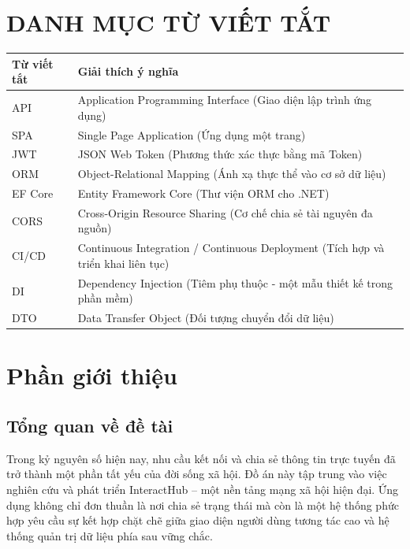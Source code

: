 \documentclass[a4paper]{article}
\begin{document}
\section*{DANH MỤC TỪ VIẾT TẮT}
\begin{table}[H]
    \centering
    \renewcommand{\arraystretch}{1.5}
    \begin{tabularx}{\textwidth}{|l|X|}
    \hline
    \rowcolor{gray!20}
    \textbf{Từ viết tắt} & \textbf{Giải thích ý nghĩa} \\
    \hline
    API & Application Programming Interface (Giao diện lập trình ứng dụng) \\
    \hline
    SPA & Single Page Application (Ứng dụng một trang) \\
    \hline
    JWT & JSON Web Token (Phương thức xác thực bằng mã Token) \\
    \hline
    ORM & Object-Relational Mapping (Ánh xạ thực thể vào cơ sở dữ liệu) \\
    \hline
    EF Core & Entity Framework Core (Thư viện ORM cho .NET) \\
    \hline
    CORS & Cross-Origin Resource Sharing (Cơ chế chia sẻ tài nguyên đa nguồn) \\
    \hline
    CI/CD & Continuous Integration / Continuous Deployment (Tích hợp và triển khai liên tục) \\
    \hline
    DI & Dependency Injection (Tiêm phụ thuộc - một mẫu thiết kế trong phần mềm) \\
    \hline
    DTO & Data Transfer Object (Đối tượng chuyển đổi dữ liệu) \\
    \hline
    \end{tabularx}
\end{table}

\newpage



\section{Phần giới thiệu}
\subsection{Tổng quan về đề tài}

    Trong kỷ nguyên số hiện nay, nhu cầu kết nối và chia sẻ thông tin trực tuyến đã trở thành một phần tất yếu của đời sống xã hội. Đồ án này tập trung vào việc nghiên cứu và phát triển InteractHub – một nền tảng mạng xã hội hiện đại. Ứng dụng không chỉ đơn thuần là nơi chia sẻ trạng thái mà còn là một hệ thống phức hợp yêu cầu sự kết hợp chặt chẽ giữa giao diện người dùng tương tác cao và hệ thống quản trị dữ liệu phía sau vững chắc.
	
\end{document}
